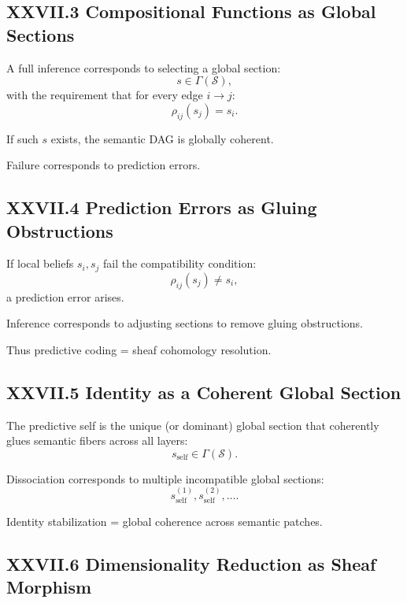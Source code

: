 \documentclass[12pt,letterpaper]{article}
\begin{document}
\subsection{XXVII.3 Compositional Functions as Global Sections}

A full inference corresponds to selecting a global section:
\[
s \in \Gamma(\mathcal{S}),
\]
with the requirement that for every edge $i\to j$:
\[
\rho_{ij}(s_j) = s_i.
\]

If such $s$ exists, the semantic DAG is globally coherent.

Failure corresponds to prediction errors.

\subsection{XXVII.4 Prediction Errors as Gluing Obstructions}

If local beliefs $s_i, s_j$ fail the compatibility condition:
\[
\rho_{ij}(s_j) \ne s_i,
\]
a prediction error arises.

Inference corresponds to adjusting sections to remove gluing obstructions.

Thus predictive coding = sheaf cohomology resolution.

\subsection{XXVII.5 Identity as a Coherent Global Section}

The predictive self is the unique (or dominant) global section that coherently glues semantic fibers across all layers:
\[
s_{\text{self}} \in \Gamma(\mathcal{S}).
\]

Dissociation corresponds to multiple incompatible global sections:
\[
s_{\text{self}}^{(1)}, s_{\text{self}}^{(2)}, \dots.
\]

Identity stabilization = global coherence across semantic patches.

\subsection{XXVII.6 Dimensionality Reduction as Sheaf Morphism}
\end{document}
